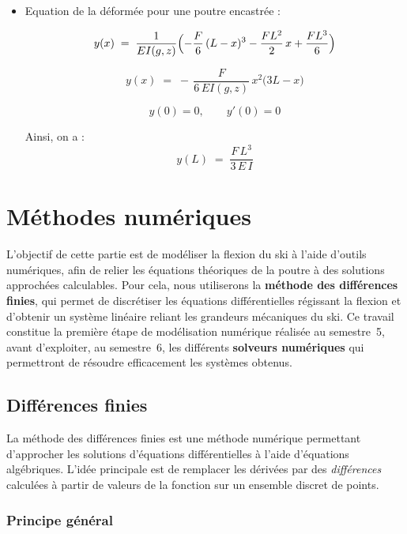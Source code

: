 \documentclass[12pt, a4paper]{article}
\begin{document}
\begin{itemize}
\begin{itemize}
    \[
\dv{T_{y}(x)}{x} =-q(x)
\]
où $q(x)$ est \textbf{la charge répartie}
\end{itemize}
\\

\item Equation de la déformée pour une poutre encastrée :

\[
y(x) \;=\; \frac{1}{E I(g,z)}
\Bigl(
-\frac{F}{6}\,(L-x)^{3}
-\frac{F L^{2}}{2}\,x
+\frac{F L^{3}}{6}
\Bigr)
\]

\[
y(x) \;=\; -\,\frac{F}{6\,E I(g,z)}\,x^{2}\bigl(3L - x\bigr)
\]

\[
y(0)=0, \qquad y'(0)=0
\]

Ainsi, on a :
  \[
y(L) \;=\; \frac{F\,L^{3}}{3\,E\,I}
\]
\end{itemize}

\section{\textbf{Méthodes numériques}}

L’objectif de cette partie est de modéliser la flexion du ski à l’aide d’outils numériques, afin de relier les équations théoriques de la poutre à des solutions approchées calculables.  
Pour cela, nous utiliserons la \textbf{méthode des différences finies}, qui permet de discrétiser les équations différentielles régissant la flexion et d’obtenir un système linéaire reliant les grandeurs mécaniques du ski.  
Ce travail constitue la première étape de modélisation numérique réalisée au semestre~5, avant d’exploiter, au semestre~6, les différents \textbf{solveurs numériques} qui permettront de résoudre efficacement les systèmes obtenus.

\subsection{Différences finies}

La méthode des différences finies est une méthode numérique permettant d'approcher
les solutions d'équations différentielles à l'aide d'équations algébriques.
L'idée principale est de remplacer les dérivées par des \textit{différences}
calculées à partir de valeurs de la fonction sur un ensemble discret de points.

\subsubsection{Principe général}
\end{document}
